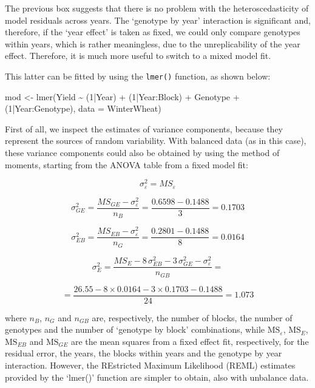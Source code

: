 \documentclass[a4paper,12pt,oneside]{book}
\newenvironment{Shaded}{\begin{snugshade}}{\end{snugshade}}
\newcommand{\DecValTok}[1]{#1}
\newcommand{\SpecialCharTok}[1]{#1}
\newcommand{\OtherTok}[1]{#1}
\newcommand{\FunctionTok}[1]{#1}
\newcommand{\AttributeTok}[1]{#1}
\newcommand{\NormalTok}[1]{#1}
\begin{document}
The previous box suggests that there is no problem with the heteroscedasticity of model residuals across years. The `genotype by year' interaction is significant and, therefore, if the `year effect' is taken as fixed, we could only compare genotypes within years, which is rather meaningless, due to the unreplicability of the year effect. Therefore, it is much more useful to switch to a mixed model fit.

This latter can be fitted by using the \texttt{lmer()} function, as shown below:

\begin{Shaded}
\begin{Highlighting}[]
\NormalTok{mod }\OtherTok{\textless{}{-}} \FunctionTok{lmer}\NormalTok{(Yield }\SpecialCharTok{\textasciitilde{}}\NormalTok{ (}\DecValTok{1}\SpecialCharTok{|}\NormalTok{Year) }\SpecialCharTok{+}\NormalTok{ (}\DecValTok{1}\SpecialCharTok{|}\NormalTok{Year}\SpecialCharTok{:}\NormalTok{Block) }\SpecialCharTok{+}\NormalTok{ Genotype }\SpecialCharTok{+}
\NormalTok{               (}\DecValTok{1}\SpecialCharTok{|}\NormalTok{Year}\SpecialCharTok{:}\NormalTok{Genotype),}
             \AttributeTok{data =}\NormalTok{ WinterWheat)}
\end{Highlighting}
\end{Shaded}

First of all, we inspect the estimates of variance components, because they represent the sources of random variability. With balanced data (as in this case), these variance components could also be obtained by using the method of moments, starting from the ANOVA table from a fixed model fit:

\[\sigma^2_{\varepsilon} = MS_{\varepsilon}\]

\[ \sigma^2_{GE} = \frac{MS_{GE} - \sigma^2_{\varepsilon}}{n_B} = \frac{0.6598 - 0.1488}{3} = 0.1703\]

\[ \sigma^2_{EB} = \frac{MS_{EB} - \sigma^2_{\varepsilon}}{n_G} = \frac{0.2801 - 0.1488}{8} = 0.0164\]

\[ \sigma^2_{E} = \frac{MS_E - 8 \, \sigma^2_{EB} - 3 \, \sigma^2_{GE} -   \sigma^2_{\varepsilon}}{n_{GB}} = \]

\[ = \frac{26.55 - 8 \times 0.0164 - 3 \times 0.1703 - 0.1488}{24} = 1.073\]

where \(n_B\), \(n_G\) and \(n_{GB}\) are, respectively, the number of blocks, the number of genotypes and the number of `genotype by block' combinations, while \(\textrm{MS}_{\varepsilon}\), \(\textrm{MS}_E\), \(\textrm{MS}_{EB}\) and \(\textrm{MS}_{GE}\) are the mean squares from a fixed effect fit, respectively, for the residual error, the years, the blocks within years and the genotype by year interaction. However, the REstricted Maximum Likelihood (REML) estimates provided by the `lmer()' function are simpler to obtain, also with unbalance data.
\end{document}
